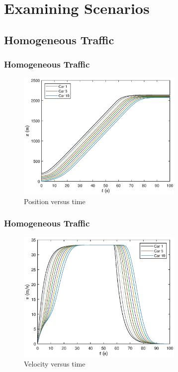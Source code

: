 \documentclass{beamer}
\begin{document}
\section{Examining Scenarios}

\subsection{Homogeneous Traffic}

\begin{frame}
  \frametitle{Homogeneous Traffic}
  \begin{figure}[H]
    \includegraphics[width=8cm]{HomogeneousTraffic1.eps}
    \caption{Position versus time} 
\end{figure}
\end{frame}

\begin{frame}
  \frametitle{Homogeneous Traffic}
  \begin{figure}[H]
    \includegraphics[width=8cm]{HomogeneousTraffic2.eps}
    \caption{Velocity versus time}
\end{figure}
\end{frame}
\end{document}
